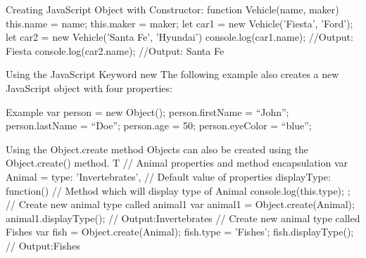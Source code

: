 Creating JavaScript Object with Constructor:
function Vehicle(name, maker) {
   this.name = name;
   this.maker = maker;
}
let car1 = new Vehicle(’Fiesta’, 'Ford’);
let car2 = new Vehicle(’Santa Fe’, 'Hyundai’)
console.log(car1.name);    //Output: Fiesta
console.log(car2.name);    //Output: Santa Fe

Using the JavaScript Keyword new
The following example also creates a new JavaScript object with four properties:

Example
var person = new Object();
person.firstName = “John”;
person.lastName = “Doe”;
person.age = 50;
person.eyeColor = “blue”;


Using the Object.create method
Objects can also be created using the Object.create() method. T
// Animal properties and method encapsulation
var Animal = {
  type: 'Invertebrates', // Default value of properties
  displayType: function() {  // Method which will display type of Animal
    console.log(this.type);
  }
};
// Create new animal type called animal1 
var animal1 = Object.create(Animal);
animal1.displayType(); // Output:Invertebrates
// Create new animal type called Fishes
var fish = Object.create(Animal);
fish.type = 'Fishes';
fish.displayType(); 
// Output:Fishes
